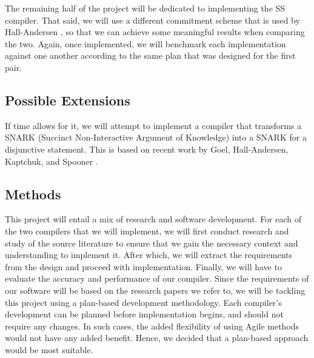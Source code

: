 The remaining half of the project will be dedicated to implementing the SS compiler. That said, we will use a different commitment scheme that is used by Hall-Andersen \cite{MHAStackSig}, so that we can achieve some meaningful results when comparing the two. Again, once implemented, we will benchmark each implementation against one another according to the same plan that was designed for the first pair.

\subsection{Possible Extensions}

If time allows for it, we will attempt to implement a compiler that transforms a SNARK (Succinct Non-Interactive Argument of Knowledge) into a SNARK for a disjunctive statement. This is based on recent work by Goel, Hall-Andersen, Kaptchuk, and Spooner \cite{SpeedStacking}.



\subsection{Methods}
This project will entail a mix of research and software development. For each of the two compilers that we will implement, we will first conduct research and study of the source literature to ensure that we gain the necessary context and understanding to implement it. After which, we will extract the requirements from the design and proceed with implementation. Finally, we will have to evaluate the accuracy and performance of our compiler. Since the requirements of our software will be based on the research papers we refer to, we will be tackling this project using a plan-based development methodology. Each compiler's development can be planned before implementation begins, and should not require any changes. In such cases, the added flexibility of using Agile methods would not have any added benefit. Hence, we decided that a plan-based approach would be most suitable.

